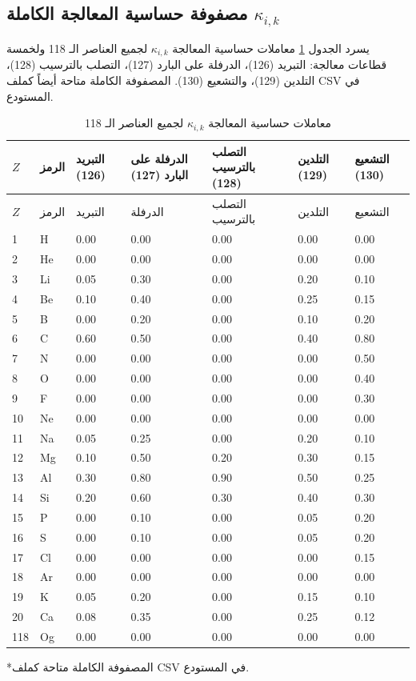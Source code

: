 \documentclass[11pt,a4paper]{article}
\begin{document}
\begin{otherlanguage}{arabic}
		\subsection{مصفوفة حساسية المعالجة الكاملة \(\kappa_{i,k}\)}
		\label{subsec:full-kappa-ik}
		
		يسرد الجدول \ref{tab:kappa-ik-full} معاملات حساسية المعالجة \(\kappa_{i,k}\) لجميع العناصر الـ 118 ولخمسة قطاعات معالجة: التبريد (126)، الدرفلة على البارد (127)، التصلب بالترسيب (128)، التلدين (129)، والتشعيع (130). المصفوفة الكاملة متاحة أيضاً كملف CSV في المستودع.
		
		\begin{longtable}{p{2.2cm}p{1.2cm}p{2.2cm}p{2.2cm}p{2.2cm}p{2.2cm}p{2.2cm}}
			\caption{معاملات حساسية المعالجة \(\kappa_{i,k}\) لجميع العناصر الـ 118} \label{tab:kappa-ik-full} \\
			\toprule
			\(Z\) & الرمز & التبريد (126) & الدرفلة على البارد (127) & التصلب بالترسيب (128) & التلدين (129) & التشعيع (130) \\
			\midrule
			\endfirsthead
			\toprule
			\(Z\) & الرمز & التبريد & الدرفلة & التصلب بالترسيب & التلدين & التشعيع \\
			\midrule
			\endhead
			1  & H   & 0.00 & 0.00 & 0.00 & 0.00 & 0.00 \\
			2  & He  & 0.00 & 0.00 & 0.00 & 0.00 & 0.00 \\
			3  & Li  & 0.05 & 0.30 & 0.00 & 0.20 & 0.10 \\
			4  & Be  & 0.10 & 0.40 & 0.00 & 0.25 & 0.15 \\
			5  & B   & 0.00 & 0.20 & 0.00 & 0.10 & 0.20 \\
			6  & C   & 0.60 & 0.50 & 0.00 & 0.40 & 0.80 \\
			7  & N   & 0.00 & 0.00 & 0.00 & 0.00 & 0.50 \\
			8  & O   & 0.00 & 0.00 & 0.00 & 0.00 & 0.40 \\
			9  & F   & 0.00 & 0.00 & 0.00 & 0.00 & 0.30 \\
			10 & Ne  & 0.00 & 0.00 & 0.00 & 0.00 & 0.00 \\
			11 & Na  & 0.05 & 0.25 & 0.00 & 0.20 & 0.10 \\
			12 & Mg  & 0.10 & 0.50 & 0.20 & 0.30 & 0.15 \\
			13 & Al  & 0.30 & 0.80 & 0.90 & 0.50 & 0.25 \\
			14 & Si  & 0.20 & 0.60 & 0.30 & 0.40 & 0.30 \\
			15 & P   & 0.00 & 0.10 & 0.00 & 0.05 & 0.20 \\
			16 & S   & 0.00 & 0.10 & 0.00 & 0.05 & 0.20 \\
			17 & Cl  & 0.00 & 0.00 & 0.00 & 0.00 & 0.15 \\
			18 & Ar  & 0.00 & 0.00 & 0.00 & 0.00 & 0.00 \\
			19 & K   & 0.05 & 0.20 & 0.00 & 0.15 & 0.10 \\
			20 & Ca  & 0.08 & 0.35 & 0.00 & 0.25 & 0.12 \\
			118& Og  & 0.00 & 0.00 & 0.00 & 0.00 & 0.00 \\
			\bottomrule
		\end{longtable}
		*المصفوفة الكاملة متاحة كملف CSV في المستودع.
		

\end{otherlanguage}
\end{document}

